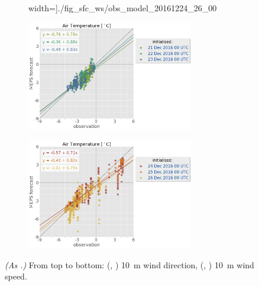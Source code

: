 \begin{figure}[H]
\begin{subfigure}[b]{0.49\textwidth}
		width=\textwidth]{./fig_sfc_ws/obs_model_20161224_26_00}
		\caption{}\label{fig:scat:ws2426}
	\end{subfigure}
	\begin{subfigure}[b]{0.49\textwidth}
		\centering
		\includegraphics[trim={25.cm 15.5cm 0cm 3.6cm},clip,
		width=0.8\textwidth]{./fig_sfc_temp/obs_model_20161221_23_00_label}
	\end{subfigure}
	\begin{subfigure}[b]{0.49\textwidth}
		\centering
		\includegraphics[trim={25.cm 15.5cm 0cm 3.6cm},clip,
		width=0.8\textwidth]{./fig_sfc_temp/obs_model_20161224_26_00_label}
	\end{subfigure}
	\caption{\textit{(As .)} From top to bottom: (\protect{}, \protect{}) \SI{10}{\metre} wind direction, (\protect{}, \protect{}) \SI{10}{\metre} wind speed.} \label{fig:scat:WD_WS}
\end{figure}
